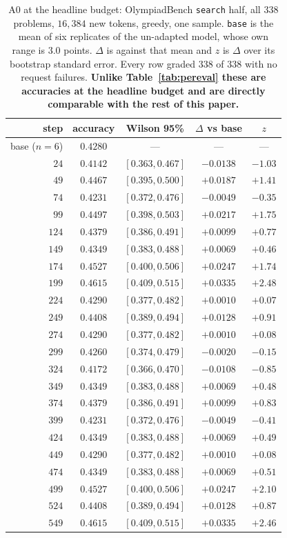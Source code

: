 \begin{table}[t]
\centering\small
\caption{A0 at the headline budget: OlympiadBench \texttt{search} half, all $338$ problems,
$16{,}384$ new tokens, greedy, one sample. \texttt{base} is the mean of six replicates of the
un-adapted model, whose own range is $3.0$ points. $\Delta$ is against that mean and $z$ is
$\Delta$ over its bootstrap standard error. Every row graded $338$ of $338$ with no request
failures. \textbf{Unlike Table~\ref{tab:pereval} these are accuracies at the headline budget
and are directly comparable with the rest of this paper.}}
\label{tab:a0headline}
\begin{tabular}{rcccc}
\toprule
step & accuracy & Wilson 95\% & $\Delta$ vs base & $z$ \\
\midrule
base ($n=6$) & $0.4280$ & --- & --- & --- \\
\midrule
$24$  & $0.4142$ & $[0.363,0.467]$ & $-0.0138$ & $-1.03$ \\
$49$  & $0.4467$ & $[0.395,0.500]$ & $+0.0187$ & $+1.41$ \\
$74$  & $0.4231$ & $[0.372,0.476]$ & $-0.0049$ & $-0.35$ \\
$99$  & $0.4497$ & $[0.398,0.503]$ & $+0.0217$ & $+1.75$ \\
$124$ & $0.4379$ & $[0.386,0.491]$ & $+0.0099$ & $+0.77$ \\
$149$ & $0.4349$ & $[0.383,0.488]$ & $+0.0069$ & $+0.46$ \\
$174$ & $0.4527$ & $[0.400,0.506]$ & $+0.0247$ & $+1.74$ \\
$199$ & $0.4615$ & $[0.409,0.515]$ & $+0.0335$ & $+2.48$ \\
$224$ & $0.4290$ & $[0.377,0.482]$ & $+0.0010$ & $+0.07$ \\
$249$ & $0.4408$ & $[0.389,0.494]$ & $+0.0128$ & $+0.91$ \\
$274$ & $0.4290$ & $[0.377,0.482]$ & $+0.0010$ & $+0.08$ \\
$299$ & $0.4260$ & $[0.374,0.479]$ & $-0.0020$ & $-0.15$ \\
$324$ & $0.4172$ & $[0.366,0.470]$ & $-0.0108$ & $-0.85$ \\
$349$ & $0.4349$ & $[0.383,0.488]$ & $+0.0069$ & $+0.48$ \\
$374$ & $0.4379$ & $[0.386,0.491]$ & $+0.0099$ & $+0.83$ \\
$399$ & $0.4231$ & $[0.372,0.476]$ & $-0.0049$ & $-0.41$ \\
$424$ & $0.4349$ & $[0.383,0.488]$ & $+0.0069$ & $+0.49$ \\
$449$ & $0.4290$ & $[0.377,0.482]$ & $+0.0010$ & $+0.08$ \\
$474$ & $0.4349$ & $[0.383,0.488]$ & $+0.0069$ & $+0.51$ \\
$499$ & $0.4527$ & $[0.400,0.506]$ & $+0.0247$ & $+2.10$ \\
$524$ & $0.4408$ & $[0.389,0.494]$ & $+0.0128$ & $+0.87$ \\
$549$ & $0.4615$ & $[0.409,0.515]$ & $+0.0335$ & $+2.46$ \\
\bottomrule
\end{tabular}
\end{table}

